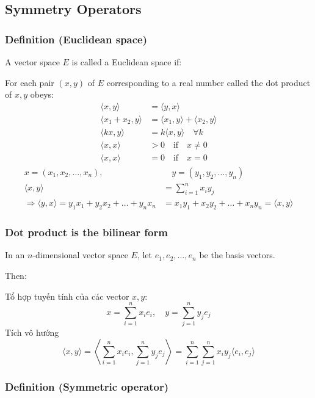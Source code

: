 \subsection{Symmetry Operators}

\subsubsection{Definition (Euclidean space)}

A vector space $E$ is called a Euclidean space if:

For each pair $(x, y)$ of $E$ corresponding to a real number called the dot product of $x, y$ obeys:
\begin{align*}
    \langle x, y \rangle &= \langle y, x \rangle\\
    \langle x_1 + x_2, y \rangle &= \langle x_1, y \rangle + \langle x_2, y \rangle\\
    \langle kx, y \rangle &= k \langle x, y \rangle \quad \forall k\\
    \langle x, x \rangle &> 0 \quad \text{if} \quad x \neq 0\\
    \langle x, x \rangle &= 0 \quad \text{if} \quad x = 0
\end{align*}
\begin{align*}
    x = (x_1, x_2, \ldots, x_n), &\quad y = (y_1, y_2, \ldots, y_n)\\
    \langle x, y \rangle &= \sum_{i=1}^n x_iy_j\\
    \Rightarrow \langle y, x \rangle = y_1x_1 + y_2x_2 + \ldots + y_nx_n &= x_1y_1 + x_2y_2 + \ldots + x_ny_n = \langle x, y \rangle
\end{align*}
\subsubsection{Dot product is the bilinear form}

In an $n$-dimensional vector space $E$, let $e_1, e_2, \ldots, e_n$ be the basis vectors.

Then:

Tổ hợp tuyến tính của các vector $x, y$:
\[
x = \sum_{i=1}^n x_i e_i, \quad y = \sum_{j=1}^n y_j e_j
\]
Tích vô hướng
\[
\langle x, y \rangle = \left\langle \sum_{i=1}^n x_i e_i, \sum_{j=1}^n y_j e_j \right\rangle = \sum_{i=1}^n \sum_{j=1}^n x_i y_j \langle e_i, e_j \rangle
\]

\subsubsection{Definition (Symmetric operator)}

